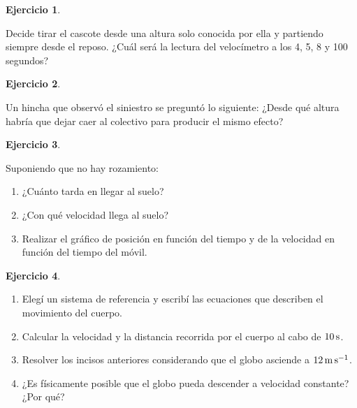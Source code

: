 \documentclass[a4paper,12pt,twoside]{book}
\newtheorem{ejercicio}{{Ejercicio}}[chapter]
\begin{document}
\begin{mdframed}[style=ejercicio-facil]
    \begin{ejercicio}
    \end{ejercicio}
    Decide tirar el cascote desde una altura solo conocida por ella y partiendo siempre desde el reposo.
    ¿Cuál será la lectura del velocímetro a los 4, 5, 8 y 100 segundos?
\end{mdframed}

\begin{mdframed}[style=ejercicio-facil]
    \begin{ejercicio}
    \end{ejercicio}
    Un hincha que observó el siniestro se preguntó lo siguiente: ¿Desde qué altura habría que dejar caer al colectivo para producir el mismo efecto?
\end{mdframed}

\begin{mdframed}[style=ejercicio-facil]
    \begin{ejercicio}
    \end{ejercicio}
    Suponiendo que no hay rozamiento:
    \begin{enumerate}
        \item ¿Cuánto tarda en llegar al suelo?
        \item ¿Con qué velocidad llega al suelo?
        \item Realizar el gráfico de posición en función del tiempo y de la velocidad en función del tiempo del móvil.
    \end{enumerate}
\end{mdframed}

\begin{mdframed}[style=ejercicio-facil]
    \begin{ejercicio}
    \end{ejercicio}
    \begin{enumerate}
        \item Elegí un sistema de referencia y escribí las ecuaciones que describen el movimiento del cuerpo.
        \item Calcular la velocidad y la distancia recorrida por el cuerpo al cabo de $10\,\si{\second}$.
        \item Resolver los incisos anteriores considerando que el globo asciende a $12\,\si{\metre\per\second}$.
        \item ¿Es físicamente posible que el globo pueda descender a velocidad constante? ¿Por qué?
    \end{enumerate}
\end{mdframed}
\end{document}

